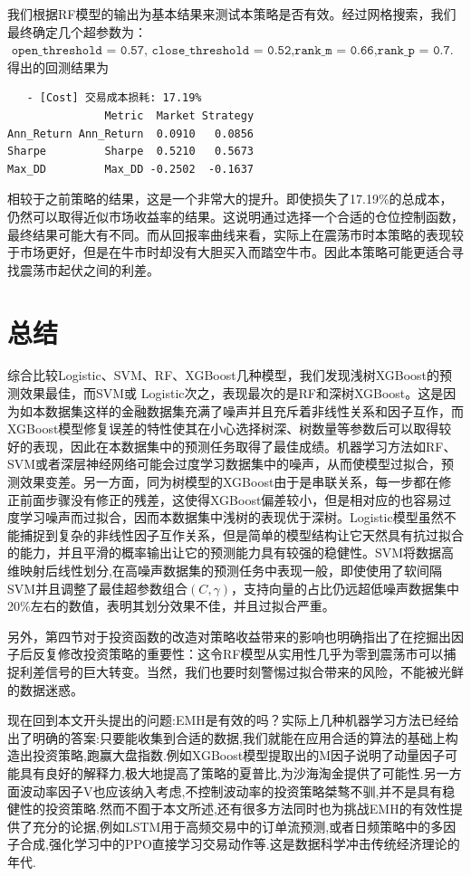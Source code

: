 \documentclass[11pt, a4paper]{article}
\begin{document}
我们根据RF模型的输出为基本结果来测试本策略是否有效。经过网格搜索，我们最终确定几个超参数为：$\texttt{ open\_threshold   = 0.57, close\_threshold   = 0.52,rank\_m = 0.66,rank\_p = 0.7}$.得出的回测结果为
\begin{verbatim}
   - [Cost] 交易成本损耗: 17.19%
               Metric  Market Strategy
Ann_Return Ann_Return  0.0910   0.0856
Sharpe         Sharpe  0.5210   0.5673
Max_DD         Max_DD -0.2502  -0.1637
\end{verbatim}
相较于之前策略的结果，这是一个非常大的提升。即使损失了17.19\%的总成本，仍然可以取得近似市场收益率的结果。这说明通过选择一个合适的仓位控制函数，最终结果可能大有不同。而从回报率曲线来看，实际上在震荡市时本策略的表现较于市场更好，但是在牛市时却没有大胆买入而踏空牛市。因此本策略可能更适合寻找震荡市起伏之间的利差。
\section{总结}
综合比较Logistic、SVM、RF、XGBoost几种模型，我们发现浅树XGBoost的预测效果最佳，而SVM或 Logistic次之，表现最次的是RF和深树XGBoost。这是因为如本数据集这样的金融数据集充满了噪声并且充斥着非线性关系和因子互作，而XGBoost模型修复误差的特性使其在小心选择树深、树数量等参数后可以取得较好的表现，因此在本数据集中的预测任务取得了最佳成绩。机器学习方法如RF、SVM或者深层神经网络可能会过度学习数据集中的噪声，从而使模型过拟合，预测效果变差。另一方面，同为树模型的XGBoost由于是串联关系，每一步都在修正前面步骤没有修正的残差，这使得XGBoost偏差较小，但是相对应的也容易过度学习噪声而过拟合，因而本数据集中浅树的表现优于深树。Logistic模型虽然不能捕捉到复杂的非线性因子互作关系，但是简单的模型结构让它天然具有抗过拟合的能力，并且平滑的概率输出让它的预测能力具有较强的稳健性。SVM将数据高维映射后线性划分,在高噪声数据集的预测任务中表现一般，即使使用了软间隔SVM并且调整了最佳超参数组合$(C,\gamma)$，支持向量的占比仍远超低噪声数据集中20\%左右的数值，表明其划分效果不佳，并且过拟合严重。

另外，第四节对于投资函数的改造对策略收益带来的影响也明确指出了在挖掘出因子后反复修改投资策略的重要性：这令RF模型从实用性几乎为零到震荡市可以捕捉利差信号的巨大转变。当然，我们也要时刻警惕过拟合带来的风险，不能被光鲜的数据迷惑。

现在回到本文开头提出的问题:EMH是有效的吗？实际上几种机器学习方法已经给出了明确的答案:只要能收集到合适的数据,我们就能在应用合适的算法的基础上构造出投资策略,跑赢大盘指数.例如XGBoost模型提取出的M因子说明了动量因子可能具有良好的解释力,极大地提高了策略的夏普比,为沙海淘金提供了可能性.另一方面波动率因子V也应该纳入考虑,不控制波动率的投资策略桀骜不驯,并不是具有稳健性的投资策略.然而不囿于本文所述,还有很多方法同时也为挑战EMH的有效性提供了充分的论据,例如LSTM用于高频交易中的订单流预测,或者日频策略中的多因子合成,强化学习中的PPO直接学习交易动作等.这是数据科学冲击传统经济理论的年代.
\clearpage
\appendix
\end{document}
